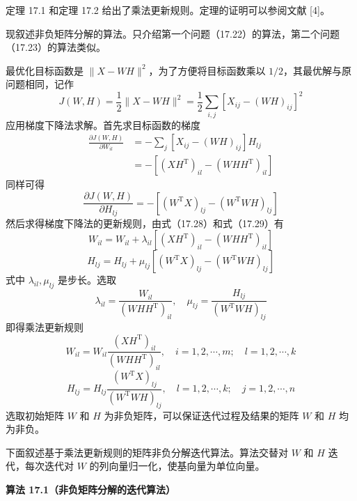 \documentclass[UTF8, 12pt, fontset=fandol, oneside]{ctexart}
\begin{document}
定理 17.1 和定理 17.2 给出了乘法更新规则。定理的证明可以参阅文献 [4]。

现叙述非负矩阵分解的算法。只介绍第一个问题（17.22）的算法，第二个问题（17.23）的算法类似。

最优化目标函数是 $\|X-WH\|^2$，为了方便将目标函数乘以 $1/2$，其最优解与原问题相同，记作
\[
J(W,H)=\frac{1}{2}\|X-WH\|^2=\frac{1}{2}\sum_{i,j}[X_{ij}-(WH)_{ij}]^2
\]
应用梯度下降法求解。首先求目标函数的梯度
\begin{equation}
\begin{aligned}
\frac{\partial J(W,H)}{\partial W_{il}}
&=-\sum_j[X_{ij}-(WH)_{ij}]H_{lj}\\
&=-[(XH^{\mathrm{T}})_{il}-(WHH^{\mathrm{T}})_{il}]
\end{aligned}
\tag{17.28}
\end{equation}
同样可得
\begin{equation}
\frac{\partial J(W,H)}{\partial H_{lj}}
=-[(W^{\mathrm{T}}X)_{lj}-(W^{\mathrm{T}}WH)_{lj}]
\tag{17.29}
\end{equation}
然后求得梯度下降法的更新规则，由式（17.28）和式（17.29）有
\begin{equation}
W_{il}=W_{il}+\lambda_{il}[(XH^{\mathrm{T}})_{il}-(WHH^{\mathrm{T}})_{il}]
\tag{17.30}
\end{equation}
\begin{equation}
H_{lj}=H_{lj}+\mu_{lj}[(W^{\mathrm{T}}X)_{lj}-(W^{\mathrm{T}}WH)_{lj}]
\tag{17.31}
\end{equation}
式中 $\lambda_{il},\mu_{lj}$ 是步长。选取
\begin{equation}
\lambda_{il}=\frac{W_{il}}{(WHH^{\mathrm{T}})_{il}},\quad
\mu_{lj}=\frac{H_{lj}}{(W^{\mathrm{T}}WH)_{lj}}
\tag{17.32}
\end{equation}
即得乘法更新规则
\begin{equation}
W_{il}=W_{il}\frac{(XH^{\mathrm{T}})_{il}}{(WHH^{\mathrm{T}})_{il}},\quad
i=1,2,\cdots,m;\quad l=1,2,\cdots,k
\tag{17.33}
\end{equation}
\begin{equation}
H_{lj}=H_{lj}\frac{(W^{\mathrm{T}}X)_{lj}}{(W^{\mathrm{T}}WH)_{lj}},\quad
l=1,2,\cdots,k;\quad j=1,2,\cdots,n
\tag{17.34}
\end{equation}
选取初始矩阵 $W$ 和 $H$ 为非负矩阵，可以保证迭代过程及结果的矩阵 $W$ 和 $H$ 均为非负。

下面叙述基于乘法更新规则的矩阵非负分解迭代算法。算法交替对 $W$ 和 $H$ 迭代，每次迭代对 $W$ 的列向量归一化，使基向量为单位向量。

\noindent\textbf{算法 17.1（非负矩阵分解的迭代算法）}
\end{document}
